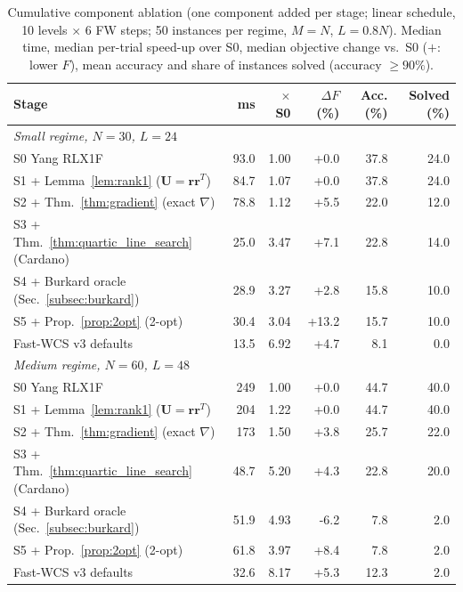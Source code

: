 \begin{table}[!t]
\centering
\caption{Cumulative component ablation (one component added per stage; linear schedule, 10 levels $\times$ 6 FW steps; 50 instances per regime, $M{=}N$, $L{=}0.8N$). Median time, median per-trial speed-up over S0, median objective change vs.\ S0 ($+$: lower $F$), mean accuracy and share of instances solved (accuracy $\geq 90\%$).}
\label{tab:ablation}
\fontsize{6.0}{7.2}\selectfont
\setlength{\tabcolsep}{1.5pt}
\begin{tabular*}{\columnwidth}{@{\extracolsep{\fill}}lrrrrr@{}}
\toprule
Stage & ms & $\times$S0 & $\Delta F$ (\%) & Acc. (\%) & Solved (\%) \\
\midrule
\multicolumn{6}{l}{\textit{Small regime, $N{=}30$, $L{=}24$}} \\
S0 Yang RLX1F~\cite{yang2018algorithm} & 93.0 & 1.00 & +0.0 & 37.8 & 24.0 \\
S1 + Lemma~\ref{lem:rank1} ($\mathbf{U}{=}\mathbf{r}\mathbf{r}^T$) & 84.7 & 1.07 & +0.0 & 37.8 & 24.0 \\
S2 + Thm.~\ref{thm:gradient} (exact $\nabla$) & 78.8 & 1.12 & +5.5 & 22.0 & 12.0 \\
S3 + Thm.~\ref{thm:quartic_line_search} (Cardano) & 25.0 & 3.47 & +7.1 & 22.8 & 14.0 \\
S4 + Burkard oracle (Sec.~\ref{subsec:burkard}) & 28.9 & 3.27 & +2.8 & 15.8 & 10.0 \\
S5 + Prop.~\ref{prop:2opt} (2-opt) & 30.4 & 3.04 & +13.2 & 15.7 & 10.0 \\
Fast-WCS v3 defaults & 13.5 & 6.92 & +4.7 & 8.1 & 0.0 \\
\midrule
\multicolumn{6}{l}{\textit{Medium regime, $N{=}60$, $L{=}48$}} \\
S0 Yang RLX1F~\cite{yang2018algorithm} & 249 & 1.00 & +0.0 & 44.7 & 40.0 \\
S1 + Lemma~\ref{lem:rank1} ($\mathbf{U}{=}\mathbf{r}\mathbf{r}^T$) & 204 & 1.22 & +0.0 & 44.7 & 40.0 \\
S2 + Thm.~\ref{thm:gradient} (exact $\nabla$) & 173 & 1.50 & +3.8 & 25.7 & 22.0 \\
S3 + Thm.~\ref{thm:quartic_line_search} (Cardano) & 48.7 & 5.20 & +4.3 & 22.8 & 20.0 \\
S4 + Burkard oracle (Sec.~\ref{subsec:burkard}) & 51.9 & 4.93 & -6.2 & 7.8 & 2.0 \\
S5 + Prop.~\ref{prop:2opt} (2-opt) & 61.8 & 3.97 & +8.4 & 7.8 & 2.0 \\
Fast-WCS v3 defaults & 32.6 & 8.17 & +5.3 & 12.3 & 2.0 \\

\end{tabular*}
\end{table}
